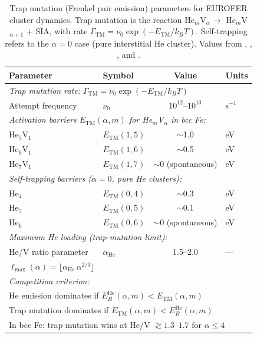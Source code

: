 \documentclass[pdflatex,sn-basic]{sn-jnl} %
\begin{document}
\begin{table}[htbp]
\centering
\caption{Trap mutation (Frenkel pair emission) parameters for EUROFER cluster
dynamics. Trap mutation is the reaction
He$_m$V$_\alpha \to$ He$_m$V$_{\alpha+1}$ + SIA, with rate
$\Gamma_{\mathrm{TM}} = \nu_0\exp(-E_{\mathrm{TM}}/k_BT)$. Self-trapping
refers to the $\alpha = 0$ case (pure interstitial He cluster). Values
from \citet{Morishita2003}, \citet{Gao2011_HeFe}, \citet{Fu2005He},
and \citet{Becquart2014_TM}.}
\label{tab:TM_code_params}
\renewcommand{\arraystretch}{1.15}
\begin{tabular}{@{}llcl@{}}
\toprule
\textbf{Parameter} & \textbf{Symbol} & \textbf{Value} & \textbf{Units} \\
\midrule
\multicolumn{4}{l}{\emph{Trap mutation rate:
$\Gamma_{\mathrm{TM}} = \nu_0\exp(-E_{\mathrm{TM}}/k_BT)$}} \\
Attempt frequency & $\nu_0$ & $10^{12}$--$10^{13}$ & s$^{-1}$ \\[4pt]

\multicolumn{4}{l}{\emph{Activation barriers $E_{\mathrm{TM}}(\alpha,m)$ for He$_m$V$_\alpha$ in bcc Fe:}} \\
He$_5$V$_1$ & $E_{\mathrm{TM}}(1,5)$ & $\sim$1.0 & eV \\
He$_6$V$_1$ & $E_{\mathrm{TM}}(1,6)$ & $\sim$0.5 & eV \\
He$_7$V$_1$ & $E_{\mathrm{TM}}(1,7)$ & $\sim$0 (spontaneous) & eV \\[4pt]

\multicolumn{4}{l}{\emph{Self-trapping barriers ($\alpha = 0$, pure He clusters):}} \\
He$_4$ & $E_{\mathrm{TM}}(0,4)$ & $\sim$0.3 & eV \\
He$_5$ & $E_{\mathrm{TM}}(0,5)$ & $\sim$0.1 & eV \\
He$_6$ & $E_{\mathrm{TM}}(0,6)$ & $\sim$0 (spontaneous) & eV \\[4pt]

\multicolumn{4}{l}{\emph{Maximum He loading (trap-mutation limit):}} \\
He/V ratio parameter & $\alpha_{\mathrm{He}}$ & 1.5--2.0 & --- \\
$\ell_{\max}(\alpha) = \lfloor\alpha_{\mathrm{He}}\,\alpha^{2/3}\rfloor$ & & & \\[4pt]

\multicolumn{4}{l}{\emph{Competition criterion:}} \\
\multicolumn{4}{l}{He emission dominates if
$E_B^{\mathrm{He}}(\alpha,m) < E_{\mathrm{TM}}(\alpha,m)$} \\
\multicolumn{4}{l}{Trap mutation dominates if
$E_{\mathrm{TM}}(\alpha,m) < E_B^{\mathrm{He}}(\alpha,m)$} \\
\multicolumn{4}{l}{In bcc Fe: trap mutation wins at He/V $\gtrsim 1.3$--$1.7$ for
$\alpha \leq 4$} \\
\bottomrule
\end{tabular}
\end{table}
\end{document}
